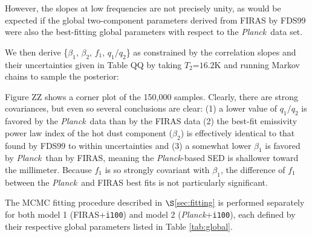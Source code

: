 \documentclass{emulateapj}
\newcommand{\PLANCK}{{\it Planck}}
\begin{document}

However, the slopes at low frequencies are not precisely unity, as would
be expected if the global two-component parameters derived from FIRAS by
FDS99 were also the best-fitting global parameters with respect to the 
\PLANCK~data set.


We then derive \{$\beta_1$, $\beta_2$, $f_1$, $q_1/q_2$\} as constrained by 
the correlation slopes and their uncertainties given in Table QQ by 
taking $T_2$=$16.2$K and running Markov chains to sample the posterior:

Figure ZZ shows a corner plot of the 150,000 samples. Clearly, there are
strong covariances, but even so several conclusions are clear: (1) a lower 
value of $q_1/q_2$ is favored by the \PLANCK~data than by the FIRAS data (2) 
the best-fit emissivity power law index of the hot dust component ($\beta_2$) 
is effectively identical to that found by FDS99 to within uncertainties and (3)
a somewhat lower $\beta_1$ is favored by \PLANCK~than by FIRAS, meaning the
\PLANCK-based SED is shallower toward the millimeter. Because $f_1$ is so 
strongly covariant with $\beta_1$, the difference of $f_1$ between the 
\PLANCK~and FIRAS best fits is not particularly significant.


The MCMC fitting procedure described in $\S$\ref{sec:fitting} is performed
separately for both model 1 (FIRAS+\verb|i100|) and model 2 
(\PLANCK+\verb|i100|), each defined by their respective global parameters 
listed in Table \ref{tab:global}.



\end{document}
